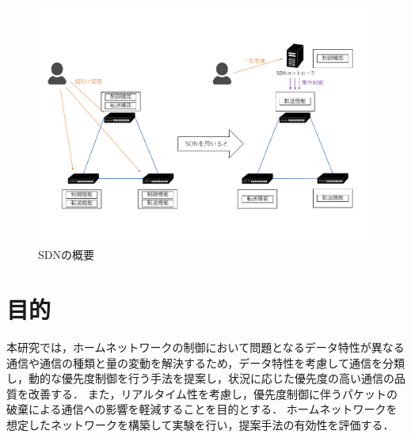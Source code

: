 \documentclass[a4paper,11pt,uplatex]{ujreport}
\begin{document}
  \begin{figure}[!tb]
    \centering
    \includegraphics[width=\linewidth]{img/SDN_trimmed.pdf}
    \caption{SDNの概要}
    \label{fig:sdn}
  \end{figure}

\section{目的}
\label{sec:目的}

    本研究では，ホームネットワークの制御において問題となるデータ特性が異なる通信や通信の種類と量の変動を解決するため，データ特性を考慮して通信を分類し，動的な優先度制御を行う手法を提案し，状況に応じた優先度の高い通信の品質を改善する．
    また，リアルタイム性を考慮し，優先度制御に伴うパケットの破棄による通信への影響を軽減することを目的とする．
    ホームネットワークを想定したネットワークを構築して実験を行い，提案手法の有効性を評価する．




\end{document}
